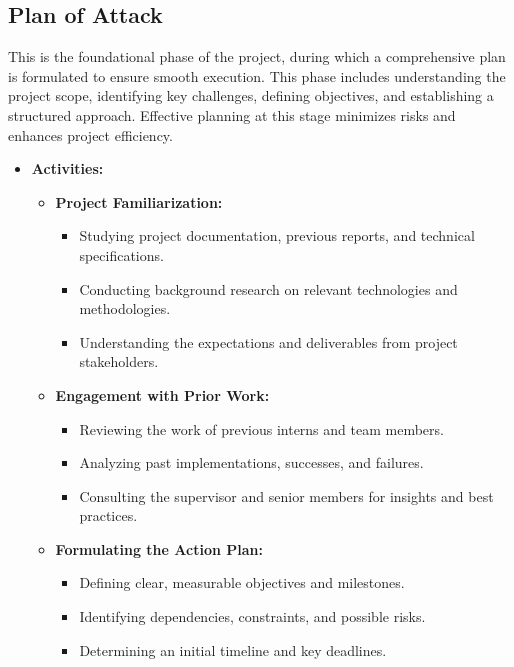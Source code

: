 \documentclass{article}
\begin{document}
\subsection{Plan of Attack}
This is the foundational phase of the project, during which a comprehensive plan is formulated to ensure smooth execution.
This phase includes understanding the project scope, identifying key challenges, defining objectives, and establishing a structured approach.
Effective planning at this stage minimizes risks and enhances project efficiency.

\begin{itemize}[leftmargin=*, label={}]
    \item \textbf{Activities:}
        \begin{itemize}
            \item \textbf{Project Familiarization:}
                \begin{itemize}
                    \item Studying project documentation, previous reports, and technical specifications.
                    \item Conducting background research on relevant technologies and methodologies.
                    \item Understanding the expectations and deliverables from project stakeholders.
                \end{itemize}
            \item \textbf{Engagement with Prior Work:}
                \begin{itemize}
                    \item Reviewing the work of previous interns and team members.
                    \item Analyzing past implementations, successes, and failures.
                    \item Consulting the supervisor and senior members for insights and best practices.
                \end{itemize}
            \item \textbf{Formulating the Action Plan:}
                \begin{itemize}
                    \item Defining clear, measurable objectives and milestones.
                    \item Identifying dependencies, constraints, and possible risks.
                    \item Determining an initial timeline and key deadlines.

\end{itemize}
\end{itemize}
\end{itemize}
\end{document}
